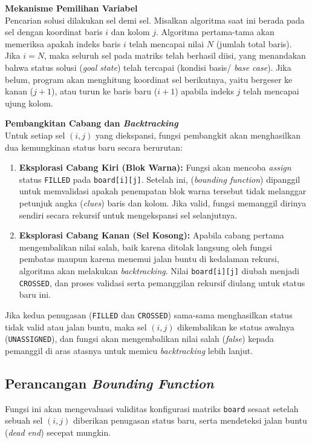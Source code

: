 \documentclass[conference]{IEEEtran}
\begin{document}
\textbf{Mekanisme Pemilihan Variabel} \\
Pencarian solusi dilakukan sel demi sel. Misalkan algoritma saat ini berada pada sel dengan koordinat baris $i$ dan kolom $j$. Algoritma pertama-tama akan memeriksa apakah indeks baris $i$ telah mencapai nilai $N$ (jumlah total baris). Jika $i = N$, maka seluruh sel pada matriks telah berhasil diisi, yang menandakan bahwa status solusi (\textit{goal state}) telah tercapai (kondisi basis/ \textit{base case}). Jika belum, program akan menghitung koordinat sel berikutnya, yaitu bergeser ke kanan ($j+1$), atau turun ke baris baru ($i+1$) apabila indeks $j$ telah mencapai ujung kolom.

\textbf{Pembangkitan Cabang dan \textit{Backtracking}} \\
Untuk setiap sel $(i, j)$ yang diekspansi, fungsi pembangkit akan menghasilkan dua kemungkinan status baru secara berurutan:
\begin{enumerate}
    \item \textbf{Eksplorasi Cabang Kiri (Blok Warna):} Fungsi akan mencoba \textit{assign} status \texttt{FILLED} pada \texttt{board[i][j]}. Setelah ini, (\textit{bounding function}) dipanggil untuk memvalidasi apakah penempatan blok warna tersebut tidak melanggar petunjuk angka (\textit{clues}) baris dan kolom. Jika valid, fungsi memanggil dirinya sendiri secara rekursif untuk mengekspansi sel selanjutnya.
    \item \textbf{Eksplorasi Cabang Kanan (Sel Kosong):} Apabila cabang pertama mengembalikan nilai salah, baik karena ditolak langsung oleh fungsi pembatas maupun karena menemui jalan buntu di kedalaman rekursi, algoritma akan melakukan \textit{backtracking}. Nilai \texttt{board[i][j]} diubah menjadi \texttt{CROSSED}, dan proses validasi serta pemanggilan rekursif diulang untuk status baru ini.
\end{enumerate}
Jika kedua penugasan (\texttt{FILLED} dan \texttt{CROSSED}) sama-sama menghasilkan status tidak valid atau jalan buntu, maka sel $(i, j)$ dikembalikan ke status awalnya (\texttt{UNASSIGNED}), dan fungsi akan mengembalikan nilai salah (\textit{false}) kepada pemanggil di aras atasnya untuk memicu \textit{backtracking} lebih lanjut.

\subsection{Perancangan \textit{Bounding Function}}
Fungsi ini akan mengevaluasi validitas konfigurasi matriks \texttt{board} sesaat setelah sebuah sel $(i, j)$ diberikan penugasan status baru, serta mendeteksi jalan buntu (\textit{dead end}) secepat mungkin.
\end{document}
